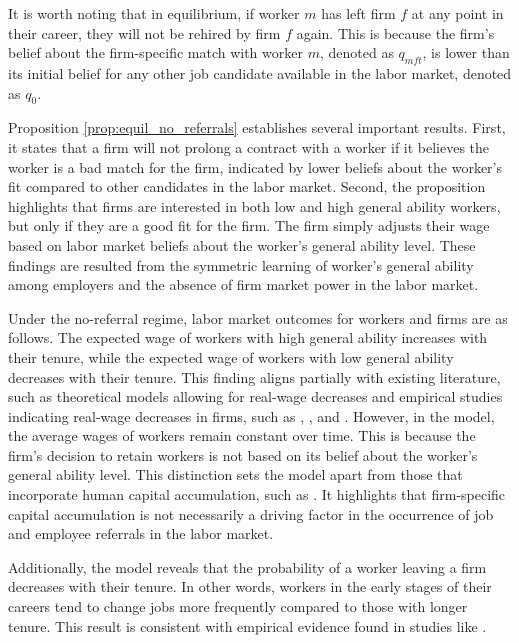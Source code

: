 \documentclass[12pt]{article}
\begin{document}
It is worth noting that in equilibrium, if worker $m$ has left firm $f$ at any point in their career, they will not be rehired by firm $f$ again. This is because the firm's belief about the firm-specific match with worker $m$, denoted as $q_{mft}$, is lower than its initial belief for any other job candidate available in the labor market, denoted as $q_0$.

Proposition \ref{prop:equil_no_referrals} establishes several important results. First, it states that a firm will not prolong a contract with a worker if it believes the worker is a bad match for the firm, indicated by lower beliefs about the worker's fit compared to other candidates in the labor market. Second, the proposition highlights that firms are interested in both low and high general ability workers, but only if they are a good fit for the firm. The firm simply adjusts their wage based on labor market beliefs about the worker's general ability level. These findings are resulted from the symmetric learning of worker's general ability among employers and the absence of firm market power in the labor market.

Under the no-referral regime, labor market outcomes for workers and firms are as follows. The expected wage of workers with high general ability increases with their tenure, while the expected wage of workers with low general ability decreases with their tenure. This finding aligns partially with existing literature, such as theoretical models allowing for real-wage decreases \citep{gibbons1999theory} and empirical studies indicating real-wage decreases in firms, such as \cite{mclaughlin1994rigid}, \cite{baker1994internal, baker1994wage}, and \cite{card1997does}. However, in the model, the average wages of workers remain constant over time. This is because the firm's decision to retain workers is not based on its belief about the worker's general ability level. This distinction sets the model apart from those that incorporate human capital accumulation, such as \cite{becker1975investment, carmichael1985wage, gibbons1999theory}. It highlights that firm-specific capital accumulation is not necessarily a driving factor in the occurrence of job and employee referrals in the labor market.

Additionally, the model reveals that the probability of a worker leaving a firm decreases with their tenure. In other words, workers in the early stages of their careers tend to change jobs more frequently compared to those with longer tenure. This result is consistent with empirical evidence found in studies like \cite{mincer1981labor}.
\end{document}
